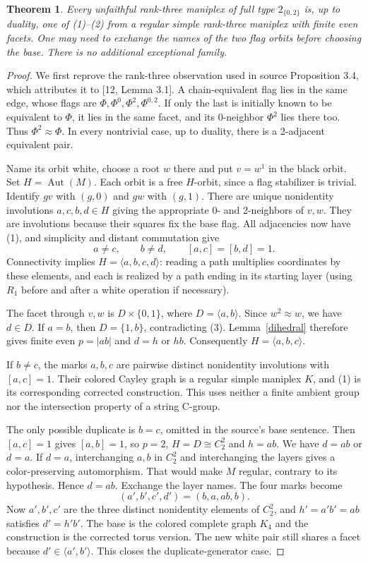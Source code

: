 \documentclass[a4paper,11pt]{article}
\newtheorem{theorem}{Theorem}\newtheorem{lemma}[theorem]{Lemma}
\newcommand{\Aut}{\operatorname{Aut}}
\begin{document}
\begin{theorem}\label{converse}
Every unfaithful rank-three maniplex of full type $2_{\{0,2\}}$ is, up to
duality, one of (1)--(2) from a regular simple rank-three maniplex with finite
even facets. One may need to exchange the names of the two flag orbits
before choosing the base. There is no additional exceptional family.
\end{theorem}
\begin{proof}
We first reprove the rank-three observation used in source Proposition 3.4,
which attributes it to [12, Lemma 3.1]. A chain-equivalent flag lies in the
same edge, whose flags are $\Phi,\Phi^0,\Phi^2,\Phi^{0,2}$. If only the
last is initially known to be equivalent to $\Phi$, it lies in the same
facet, and its 0-neighbor $\Phi^2$ lies there too. Thus $\Phi^2\approx\Phi$.
In every nontrivial case, up to duality, there is a 2-adjacent equivalent pair.

Name its orbit white, choose a root $w$ there and put $v=w^1$ in the black
orbit. Set $H=\Aut(M)$. Each orbit is a free $H$-orbit, since a flag
stabilizer is trivial. Identify $gv$ with $(g,0)$ and $gw$ with $(g,1)$.
There are unique nonidentity involutions $a,c,b,d\in H$ giving the appropriate
0- and 2-neighbors of $v,w$. They are involutions because their squares fix
the base flag. All adjacencies now have (1), and simplicity and distant
commutation give
\[
 a\ne c,\qquad b\ne d,\qquad [a,c]=[b,d]=1.\tag{3}
\]
Connectivity implies $H=\langle a,b,c,d\rangle$: reading a path multiplies
coordinates by these elements, and each is realized by a path ending in its
starting layer (using $R_1$ before and after a white operation if necessary).

The facet through $v,w$ is $D\times\{0,1\}$, where $D=\langle a,b\rangle$.
Since $w^2\approx w$, we have $d\in D$. If $a=b$, then $D=\{1,b\}$,
contradicting (3). Lemma~\ref{dihedral} therefore gives finite even $p=|ab|$
and $d=h$ or $hb$. Consequently $H=\langle a,b,c\rangle$.

If $b\ne c$, the marks $a,b,c$ are pairwise distinct nonidentity involutions
with $[a,c]=1$. Their colored Cayley graph is a regular simple maniplex $K$,
and (1) is its corresponding corrected construction. This uses neither a
finite ambient group nor the intersection property of a string C-group.

The only possible duplicate is $b=c$, omitted in the source's base sentence.
Then $[a,c]=1$ gives $[a,b]=1$, so $p=2$, $H=D\cong C_2^2$ and $h=ab$.
We have $d=ab$ or $d=a$. If $d=a$, interchanging $a,b$ in $C_2^2$ and
interchanging the layers gives a color-preserving automorphism. That would
make $M$ regular, contrary to its hypothesis. Hence $d=ab$.
Exchange the layer names. The four marks become
\[
 (a',b',c',d')=(b,a,ab,b).
\]
Now $a',b',c'$ are the three distinct nonidentity elements of $C_2^2$, and
$h'=a'b'=ab$ satisfies $d'=h'b'$. The base is the colored complete graph
$K_4$ and the construction is the corrected torus version. The new white
pair still shares a facet because $d'\in\langle a',b'\rangle$.
This closes the duplicate-generator case.
\end{proof}
\end{document}
